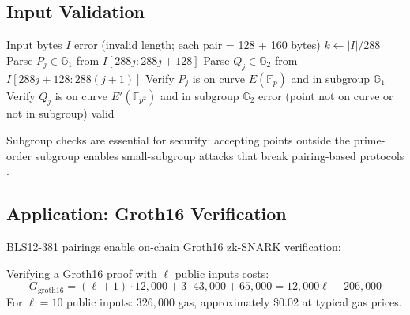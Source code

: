 \subsection{Input Validation}

\begin{algorithm}[H]
\caption{BLS12-381 Pairing Input Validation}
\label{alg:bls_validate}
\begin{algorithmic}[1]
\Require Input bytes $I$
    \State \Return error (invalid length; each pair = 128 + 160 bytes)
\EndIf
\State $k \gets |I| / 288$
    \State Parse $P_j \in \mathbb{G}_1$ from $I[288j : 288j + 128]$
    \State Parse $Q_j \in \mathbb{G}_2$ from $I[288j + 128 : 288(j+1)]$
    \State Verify $P_j$ is on curve $E(\mathbb{F}_p)$ and in subgroup $\mathbb{G}_1$
    \State Verify $Q_j$ is on curve $E'(\mathbb{F}_{p^2})$ and in subgroup $\mathbb{G}_2$
        \State \Return error (point not on curve or not in subgroup)
    \EndIf
\EndFor
\State \Return valid
\end{algorithmic}
\end{algorithm}

Subgroup checks are essential for security: accepting points outside the prime-order subgroup enables small-subgroup attacks that break pairing-based protocols \cite{barreto2006subgroup}.

\subsection{Application: Groth16 Verification}

BLS12-381 pairings enable on-chain Groth16 zk-SNARK verification:

\begin{proposition}
Verifying a Groth16 proof with $\ell$ public inputs costs:
\begin{equation}
    G_{\text{groth16}} = (\ell + 1) \cdot 12{,}000 + 3 \cdot 43{,}000 + 65{,}000 = 12{,}000\ell + 206{,}000
\end{equation}
For $\ell = 10$ public inputs: $326{,}000$ gas, approximately \$0.02 at typical gas prices.
\end{proposition}

